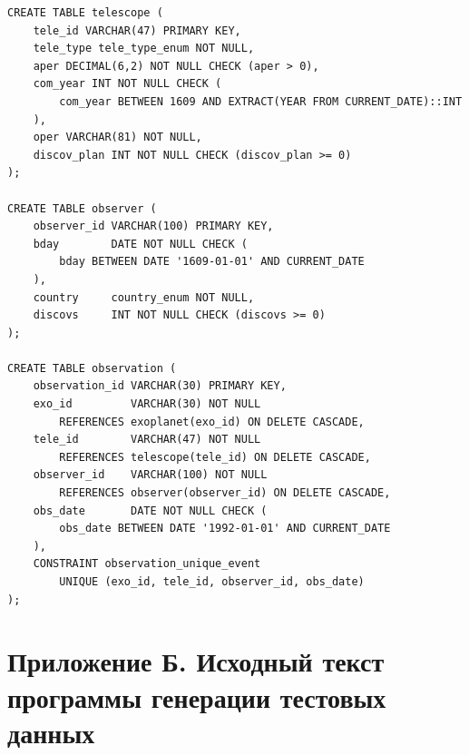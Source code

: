 \documentclass[14pt,a4paper]{extarticle}
\begin{document}
\begin{lstlisting}
CREATE TABLE telescope (
    tele_id VARCHAR(47) PRIMARY KEY,
    tele_type tele_type_enum NOT NULL,
    aper DECIMAL(6,2) NOT NULL CHECK (aper > 0),
    com_year INT NOT NULL CHECK (
        com_year BETWEEN 1609 AND EXTRACT(YEAR FROM CURRENT_DATE)::INT
    ),
    oper VARCHAR(81) NOT NULL,
    discov_plan INT NOT NULL CHECK (discov_plan >= 0)
);

CREATE TABLE observer (
    observer_id VARCHAR(100) PRIMARY KEY,
    bday        DATE NOT NULL CHECK (
        bday BETWEEN DATE '1609-01-01' AND CURRENT_DATE
    ),
    country     country_enum NOT NULL,
    discovs     INT NOT NULL CHECK (discovs >= 0)
);

CREATE TABLE observation (
    observation_id VARCHAR(30) PRIMARY KEY,
    exo_id         VARCHAR(30) NOT NULL
        REFERENCES exoplanet(exo_id) ON DELETE CASCADE,
    tele_id        VARCHAR(47) NOT NULL
        REFERENCES telescope(tele_id) ON DELETE CASCADE,
    observer_id    VARCHAR(100) NOT NULL
        REFERENCES observer(observer_id) ON DELETE CASCADE,
    obs_date       DATE NOT NULL CHECK (
        obs_date BETWEEN DATE '1992-01-01' AND CURRENT_DATE
    ),
    CONSTRAINT observation_unique_event
        UNIQUE (exo_id, tele_id, observer_id, obs_date)
);
\end{lstlisting}

\newpage

\section*{Приложение Б. Исходный текст программы генерации тестовых данных}
\label{b}
\end{document}
